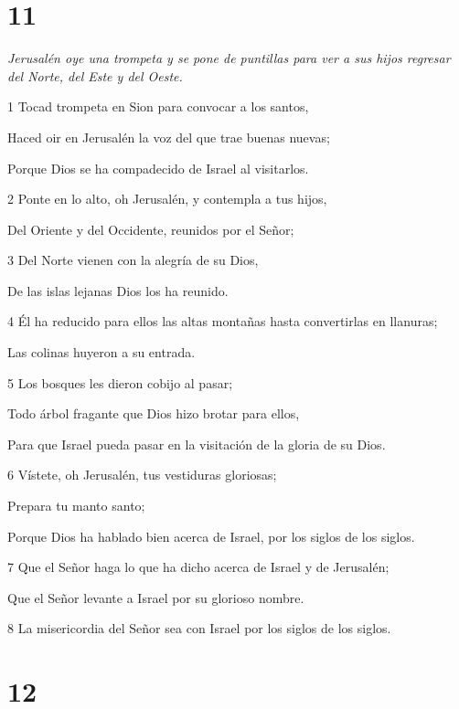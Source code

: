 \chapter{11}

\par \textit{Jerusalén oye una trompeta y se pone de puntillas para ver a sus hijos regresar del Norte, del Este y del Oeste.}

\par 1 Tocad trompeta en Sion para convocar a los santos,
\par     Haced oir en Jerusalén la voz del que trae buenas nuevas;
\par     Porque Dios se ha compadecido de Israel al visitarlos.
\par 2 Ponte en lo alto, oh Jerusalén, y contempla a tus hijos,
\par     Del Oriente y del Occidente, reunidos por el Señor;
\par 3 Del Norte vienen con la alegría de su Dios,
\par     De las islas lejanas Dios los ha reunido.
\par 4 Él ha reducido para ellos las altas montañas hasta convertirlas en llanuras;
\par     Las colinas huyeron a su entrada.
\par 5 Los bosques les dieron cobijo al pasar;
\par     Todo árbol fragante que Dios hizo brotar para ellos,
\par     Para que Israel pueda pasar en la visitación de la gloria de su Dios.
\par 6 Vístete, oh Jerusalén, tus vestiduras gloriosas;
\par     Prepara tu manto santo;
\par     Porque Dios ha hablado bien acerca de Israel, por los siglos de los siglos.
\par 7 Que el Señor haga lo que ha dicho acerca de Israel y de Jerusalén;
\par     Que el Señor levante a Israel por su glorioso nombre.
\par   
\par 8 La misericordia del Señor sea con Israel por los siglos de los siglos.



\chapter{12}

